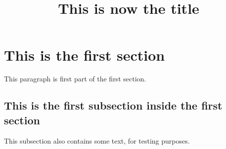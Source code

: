\documentclass[11pt]{article}
\title{This is now the title}
\begin{document}
\maketitle
   
\section{This is the first section}

This paragraph is first part of the first section.

\subsection{This is the first subsection inside the first section}

This subsection also contains some text, for testing purposes.
\end{document}
